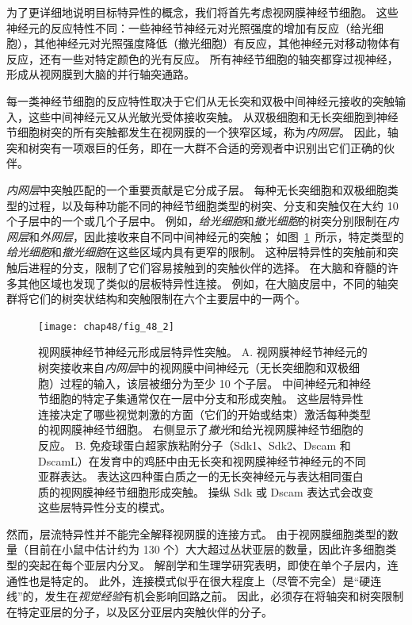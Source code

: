 为了更详细地说明目标特异性的概念，我们将首先考虑视网膜神经节细胞。
这些神经元的反应特性不同：一些神经节神经元对光照强度的增加有反应（给光细胞），其他神经元对光照强度降低（撤光细胞）有反应，其他神经元对移动物体有反应，还有一些对特定颜色的光有反应。
所有神经节细胞的轴突都穿过视神经，形成从视网膜到大脑的并行轴突通路。


每一类神经节细胞的反应特性取决于它们从无长突和双极中间神经元接收的突触输入，这些中间神经元又从光敏光受体接收突触。
从双极细胞和无长突细胞到神经节细胞树突的所有突触都发生在视网膜的一个狭窄区域，称为\textit{内网层}。
因此，轴突和树突有一项艰巨的任务，即在一大群不合适的旁观者中识别出它们正确的伙伴。


\textit{内网层}中突触匹配的一个重要贡献是它分成子层。
每种无长突细胞和双极细胞类型的过程，以及每种功能不同的神经节细胞类型的树突、分支和突触仅在大约 10 个子层中的一个或几个子层中。
例如，\textit{给光细胞}和\textit{撤光细胞}的树突分别限制在\textit{内网层}和\textit{外网层}，因此接收来自不同中间神经元的突触；
如图~\ref{fig:48_2}~所示，特定类型的\textit{给光细胞}和\textit{撤光细胞}在这些区域内具有更窄的限制。
这种层特异性的突触前和突触后进程的分支，限制了它们容易接触到的突触伙伴的选择。
在大脑和脊髓的许多其他区域也发现了类似的层板特异性连接。
例如，在大脑皮层中，不同的轴突群将它们的树突状结构和突触限制在六个主要层中的一两个。


\begin{figure}[htbp]
	\centering
	\texttt{[image: chap48/fig\_48\_2]}
	\caption{视网膜神经节神经元形成层特异性突触。
		A. 视网膜神经节神经元的树突接收来自\textit{内网层}中的视网膜中间神经元（无长突细胞和双极细胞）过程的输入，该层被细分为至少 10 个子层。
		中间神经元和神经节细胞的特定子集通常仅在一层中分支和形成突触。
		这些层特异性连接决定了哪些视觉刺激的方面（它们的开始或结束）激活每种类型的视网膜神经节细胞。
		右侧显示了\textit{撤光}和给光视网膜神经节细胞的反应。
		B. 免疫球蛋白超家族粘附分子（Sdk1、Sdk2、Dscam 和 DscamL）在发育中的鸡胚中由无长突和视网膜神经节神经元的不同亚群表达。
		表达这四种蛋白质之一的无长突神经元与表达相同蛋白质的视网膜神经节细胞形成突触。
		操纵 Sdk 或 Dscam 表达式会改变这些层特异性分支的模式。}
	\label{fig:48_2}
\end{figure}


然而，层流特异性并不能完全解释视网膜的连接方式。
由于视网膜细胞类型的数量（目前在小鼠中估计约为 130 个）大大超过丛状亚层的数量，因此许多细胞类型的突起在每个亚层内分叉。
解剖学和生理学研究表明，即使在单个子层内，连通性也是特定的。
此外，连接模式似乎在很大程度上（尽管不完全）是“硬连线”的，发生在\textit{视觉经验}有机会影响回路之前。
因此，必须存在将轴突和树突限制在特定亚层的分子，以及区分亚层内突触伙伴的分子。


